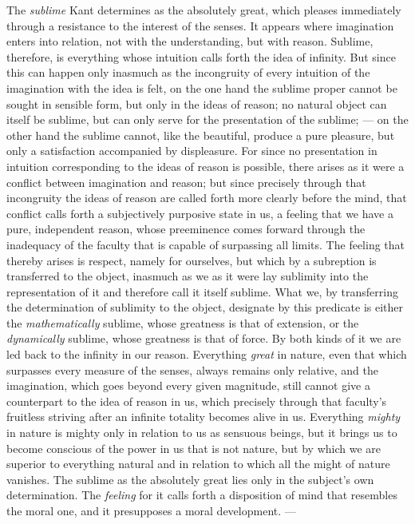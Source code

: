 The \emph{sublime} Kant determines as the absolutely great, which
pleases immediately through a resistance to the interest of the senses.
It appears where imagination enters into relation, not with the
understanding, but with reason. Sublime, therefore, is everything whose
intuition calls forth the idea of infinity. But since this can happen
only inasmuch as the incongruity of every intuition of the imagination
with the idea is felt, on the one hand the sublime proper cannot be
sought in sensible form, but only in the ideas of reason; no natural
object can itself be sublime, but can only serve for the presentation
of the sublime; --- on the other hand the sublime cannot, like the
beautiful, produce a pure pleasure, but only a satisfaction accompanied
by displeasure. For since no presentation in intuition corresponding to
the ideas of reason is possible, there arises as it were a conflict
between imagination and reason; but since precisely through that
incongruity the ideas of reason are called forth more clearly before
the mind, that conflict calls forth a subjectively purposive state in
us, a feeling that we have a pure, independent reason, whose
preeminence comes forward through the inadequacy of the faculty that is
capable of surpassing all limits. The feeling that thereby
arises is respect, namely for ourselves, but which by a subreption is
transferred to the object, inasmuch as we as it were lay sublimity into
the representation of it and therefore call it itself sublime.
What we, by transferring the determination of sublimity to the object,
designate by this predicate is either the \emph{mathematically}
sublime, whose greatness is that of extension, or the
\emph{dynamically} sublime, whose greatness is that of force. By both
kinds of it we are led back to the infinity in our reason. Everything
\emph{great} in nature, even that which surpasses every measure of the
senses, always remains only relative, and the imagination, which goes
beyond every given magnitude, still cannot give a counterpart to the
idea of reason in us, which precisely through that faculty's fruitless
striving after an infinite totality becomes alive in us. Everything
\emph{mighty} in nature is mighty only in relation to us as sensuous
beings, but it brings us to become conscious of the power in us that is
not nature, but by which we are superior to everything natural and in
relation to which all the might of nature vanishes. The sublime as the
absolutely great lies only in the subject's own determination. The
\emph{feeling} for it calls forth a disposition of mind that resembles
the moral one, and it presupposes a moral development. ---

